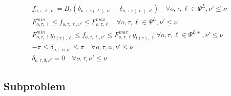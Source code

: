 \documentclass[final]{IEEEtran}
\begin{document}
\begin{align}
&f_{o, \tau, \ell, \nu'} = B_\ell (\delta_{o, \tau, s(\ell), \nu'} - \delta_{o, \tau, r(\ell), \nu'}) \quad \forall o, \tau, \ell \in \Psi^L, \nu' \leq \nu \\
&F_{o, \tau, \ell}^{min} \leq f_{o, \tau, \ell, \nu'} \leq F_{o, \tau, \ell}^{max} \quad \forall o, \tau, \ell \in \Psi^L, \nu' \leq \nu \\
&F_{o, \tau, \ell}^{min} y_{t(\tau), \ell} \leq f_{o, \tau, \ell, \nu'} \leq F_{o, \tau, \ell}^{max} y_{t(\tau), \ell} \, \forall o, \tau, \ell \in \Psi^{L+}, \nu' \leq \nu \\
&-\pi \leq \delta_{o, \tau, n, \nu'} \leq \pi \quad \forall o, \tau, n, \nu' \leq \nu \\
&\label{master_last} \delta_{o, \tau, 0, \nu'} = 0 \quad \forall o, \tau, \nu' \leq \nu
\end{align}

\subsection{Subproblem}
\end{document}
